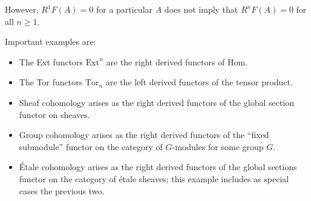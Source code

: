 \documentclass[12pt]{article}
\begin{document}
However, $R^1F(A)=0$ for a particular $A$ does not imply that $R^nF(A)=0$ for 
all $n\geq 1$.

Important examples are:
\begin{itemize}
\item The Ext functors $\mathrm{Ext}^n$ are the right derived functors of $\mathrm{Hom}$.
\item The Tor functors $\mathrm{Tor}_n$ are the left derived functors of the tensor product. 
\item Sheaf cohomology arises as the right derived functors of the global section functor on sheaves.
\item Group cohomology arises as the right derived functors of the ``fixed submodule'' functor on the category of $G$-modules for some group $G$.
\item \'Etale cohomology arises as the right derived functors of the global sections functor on the category of \'etale sheaves; this example includes as special cases the previous two.
\end{itemize}
\end{document}
